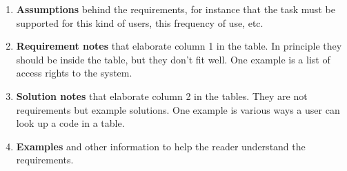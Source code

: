 \documentclass[Main]{subfiles}
\begin{document}
\begin{enumerate}[A]
\item \textbf{Assumptions} behind the requirements, for instance that the task must be supported for this kind of users, this frequency of use, etc.

\item \textbf{Requirement notes} that elaborate column 1 in the table. 
In principle they should be inside the table, but they don't fit well. 
One example is a list of access rights to the system.

\item \textbf{Solution notes} that elaborate column 2 in the tables. 
They are not requirements but example solutions. 
One example is various ways a user can look up a code in a table.

\item \textbf{Examples} and other information to help the reader understand the requirements.
\end{enumerate}
\end{document}
